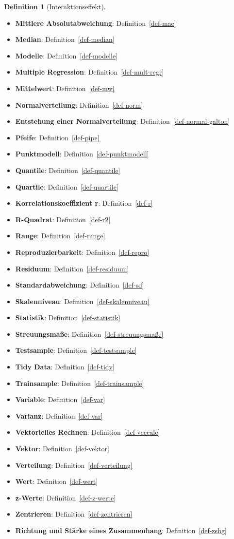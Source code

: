 \documentclass[
  letterpaper,
]{scrbook}
\theoremstyle{definition}
\theoremstyle{definition}
\theoremstyle{definition}
\newtheorem{definition}{Definition}[chapter]
\theoremstyle{remark}
\begin{document}
\begin{definition}[Interaktionseffekt]
\begin{itemize}
\item
  \textbf{Mittlere Absolutabweichung}: Definition~\ref{def-mae}
\item
  \textbf{Median}: Definition~\ref{def-median}
\item
  \textbf{Modelle}: Definition~\ref{def-modelle}
\item
  \textbf{Multiple Regression}: Definition~\ref{def-mult-regr}
\item
  \textbf{Mittelwert}: Definition~\ref{def-mw}
\item
  \textbf{Normalverteilung}: Definition~\ref{def-norm}
\item
  \textbf{Entstehung einer Normalverteilung}:
  Definition~\ref{def-normal-galton}
\item
  \textbf{Pfeife}: Definition~\ref{def-pipe}
\item
  \textbf{Punktmodell}: Definition~\ref{def-punktmodell}
\item
  \textbf{Quantile}: Definition~\ref{def-quantile}
\item
  \textbf{Quartile}: Definition~\ref{def-quartile}
\item
  \textbf{Korrelationskoeffizient r}: Definition~\ref{def-r}
\item
  \textbf{R-Quadrat}: Definition~\ref{def-r2}
\item
  \textbf{Range}: Definition~\ref{def-range}
\item
  \textbf{Reproduzierbarkeit}: Definition~\ref{def-repro}
\item
  \textbf{Residuum}: Definition~\ref{def-residuum}
\item
  \textbf{Standardabweichung}: Definition~\ref{def-sd}
\item
  \textbf{Skalenniveau}: Definition~\ref{def-skalenniveau}
\item
  \textbf{Statistik}: Definition~\ref{def-statistik}
\item
  \textbf{Streuungsmaße}: Definition~\ref{def-streuungsmaße}
\item
  \textbf{Testsample}: Definition~\ref{def-testsample}
\item
  \textbf{Tidy Data}: Definition~\ref{def-tidy}
\item
  \textbf{Trainsample}: Definition~\ref{def-trainsample}
\item
  \textbf{Variable}: Definition~\ref{def-var}
\item
  \textbf{Varianz}: Definition~\ref{def-var}
\item
  \textbf{Vektorielles Rechnen}: Definition~\ref{def-veccalc}
\item
  \textbf{Vektor}: Definition~\ref{def-vektor}
\item
  \textbf{Verteilung}: Definition~\ref{def-verteilung}
\item
  \textbf{Wert}: Definition~\ref{def-wert}
\item
  \textbf{z-Werte}: Definition~\ref{def-z-werte}
\item
  \textbf{Zentrieren}: Definition~\ref{def-zentrieren}
\item
  \textbf{Richtung und Stärke eines Zusammenhang}:
  Definition~\ref{def-zshg}
\end{itemize}


\end{definition}
\end{document}
